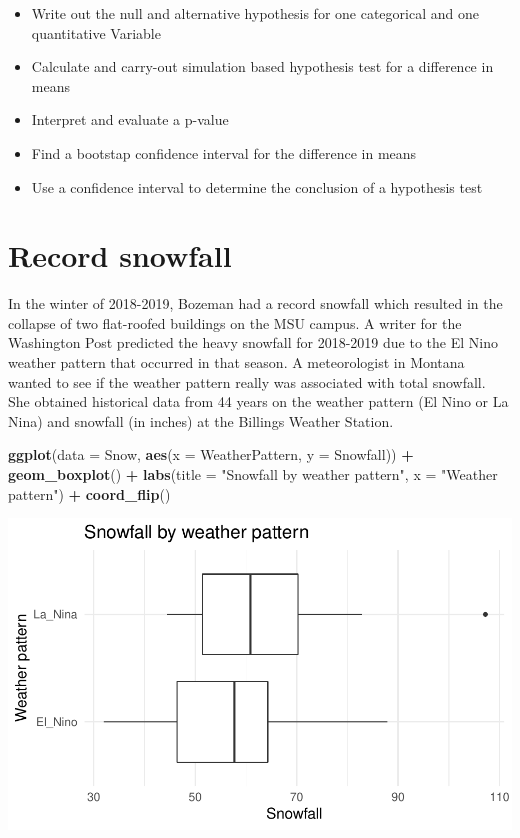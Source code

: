 \documentclass[
]{report}
\newenvironment{Shaded}{\begin{snugshade}}{\end{snugshade}}
\newcommand{\DataTypeTok}[1]{\textcolor[rgb]{0.13,0.29,0.53}{#1}}
\newcommand{\KeywordTok}[1]{\textcolor[rgb]{0.13,0.29,0.53}{\textbf{#1}}}
\newcommand{\NormalTok}[1]{#1}
\newcommand{\OperatorTok}[1]{\textcolor[rgb]{0.81,0.36,0.00}{\textbf{#1}}}
\newcommand{\StringTok}[1]{\textcolor[rgb]{0.31,0.60,0.02}{#1}}
\begin{document}
\begin{itemize}
\item
  Write out the null and alternative hypothesis for one categorical and one quantitative Variable
\item
  Calculate and carry-out simulation based hypothesis test for a difference in means
\item
  Interpret and evaluate a p-value
\item
  Find a bootstap confidence interval for the difference in means
\item
  Use a confidence interval to determine the conclusion of a hypothesis test
\end{itemize}

\hypertarget{record-snowfall-1}{%
\section{Record snowfall}\label{record-snowfall-1}}

In the winter of 2018-2019, Bozeman had a record snowfall which resulted in the collapse of two flat-roofed buildings on the MSU campus. A writer for the Washington Post predicted the heavy snowfall for 2018-2019 due to the El Nino weather pattern that occurred in that season. A meteorologist in Montana wanted to see if the weather pattern really was associated with total snowfall. She obtained historical data from 44 years on the weather pattern (El Nino or La Nina) and snowfall (in inches) at the Billings Weather Station.

\begin{Shaded}
\begin{Highlighting}[]
\KeywordTok{ggplot}\NormalTok{(}\DataTypeTok{data =}\NormalTok{ Snow,}
       \KeywordTok{aes}\NormalTok{(}\DataTypeTok{x =}\NormalTok{ WeatherPattern, }\DataTypeTok{y =}\NormalTok{ Snowfall)) }\OperatorTok{+}
\StringTok{    }\KeywordTok{geom\_boxplot}\NormalTok{() }\OperatorTok{+}\StringTok{ }
\StringTok{    }\KeywordTok{labs}\NormalTok{(}\DataTypeTok{title =} \StringTok{"Snowfall by weather pattern"}\NormalTok{,}
         \DataTypeTok{x =} \StringTok{"Weather pattern"}\NormalTok{) }\OperatorTok{+}
\StringTok{    }\KeywordTok{coord\_flip}\NormalTok{()}
\end{Highlighting}
\end{Shaded}

\begin{center}\includegraphics[width=0.6\linewidth]{09-inference-2quant_files/figure-latex/unnamed-chunk-2-1} \end{center}
\end{document}
